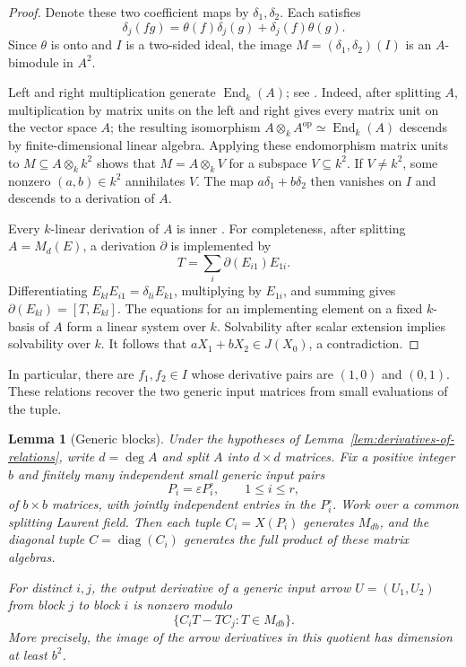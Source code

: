 \documentclass[11pt]{article}
\newtheorem{lemma}[theorem]{Lemma}
\theoremstyle{definition}
\theoremstyle{remark}
\numberwithin{equation}{section}
\begin{document}
\begin{proof}
Denote these two coefficient maps by $\delta_1,\delta_2$.  Each
satisfies
\[
 \delta_j(fg)=\theta(f)\delta_j(g)+\delta_j(f)\theta(g).
\]
Since $\theta$ is onto and $I$ is a two-sided ideal, the image
$M=(\delta_1,\delta_2)(I)$ is an $A$-bimodule in $A^2$.

Left and right multiplication generate $\operatorname{End}_k(A)$;
see \cite[Chapter~IV, Corollary~2.9]{MilneCFT}.
Indeed, after splitting $A$, multiplication by matrix units on the
left and right gives every matrix unit on the vector space $A$;
the resulting isomorphism
$A\otimes_k A^{\mathrm{op}}\simeq\operatorname{End}_k(A)$ descends
by finite-dimensional linear algebra.  Applying these endomorphism
matrix units to $M\subseteq A\otimes_k k^2$ shows that
$M=A\otimes_k V$ for a subspace $V\subseteq k^2$.
If $V\ne k^2$, some nonzero $(a,b)\in k^2$ annihilates $V$.
The map $a\delta_1+b\delta_2$ then vanishes on $I$ and descends to
a derivation of $A$.

Every $k$-linear derivation of $A$ is inner
\cite[Theorem~8]{Jacobson1937Derivations}. For completeness, after
splitting $A=M_d(E)$, a derivation $\partial$ is implemented by
\[
 T=\sum_i\partial(E_{i1})E_{1i}.
\]
Differentiating $E_{kl}E_{i1}=\delta_{li}E_{k1}$, multiplying by
$E_{1i}$, and summing gives $\partial(E_{kl})=[T,E_{kl}]$.
The equations for an implementing element on a fixed $k$-basis of
$A$ form a linear system over $k$.  Solvability after scalar
extension implies solvability over $k$.
It follows that $aX_1+bX_2\in J(X_0)$, a contradiction.
\end{proof}

In particular, there are $f_1,f_2\in I$ whose derivative pairs are
$(1,0)$ and $(0,1)$.  These relations recover the two generic input
matrices from small evaluations of the tuple.

\begin{lemma}[Generic blocks]
\label{lem:generic-generating-blocks}
Under the hypotheses of Lemma~\ref{lem:derivatives-of-relations},
write $d=\deg A$ and split $A$ into $d\times d$ matrices.  Fix a
positive integer $b$ and finitely many independent small generic input pairs
\[
 P_i=\varepsilon P_i^{\circ},\qquad 1\le i\le r,
\]
of $b\times b$ matrices, with jointly independent entries in the
$P_i^{\circ}$.  Work over a common splitting Laurent field.
Then each tuple $C_i=X(P_i)$ generates $M_{db}$, and the diagonal
tuple $C=\operatorname{diag}(C_i)$ generates the full product of
these matrix algebras.

For distinct $i,j$, the output derivative of a generic input arrow
$U=(U_1,U_2)$ from block $j$ to block $i$ is nonzero modulo
\[
 \{C_iT-TC_j:T\in M_{db}\}.
\]
More precisely, the image of the arrow derivatives in this quotient
has dimension at least $b^2$.
\end{lemma}
\end{document}
